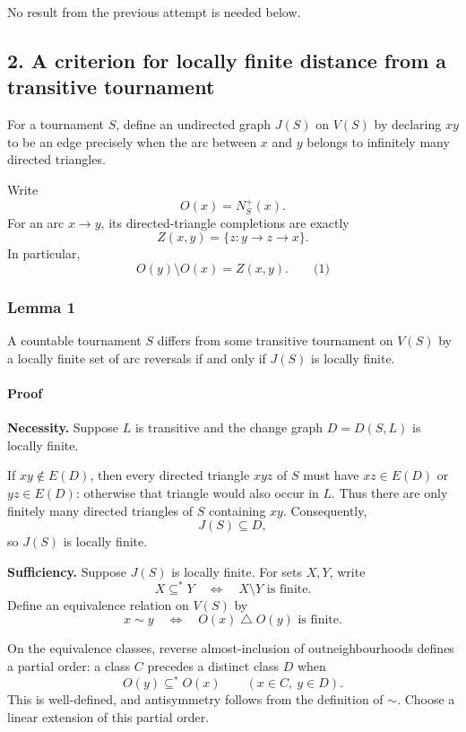 \documentclass[
  11pt,
  a4paper,
]{article}
\begin{document}
No result from the previous attempt is needed below.

\subsection{2. A criterion for locally finite distance from a transitive
tournament}\label{a-criterion-for-locally-finite-distance-from-a-transitive-tournament}

For a tournament \(S\), define an undirected graph \(J(S)\) on \(V(S)\)
by declaring \(xy\) to be an edge precisely when the arc between \(x\)
and \(y\) belongs to infinitely many directed triangles.

Write \[
O(x)=N_S^+(x).
\] For an arc \(x\to y\), its directed-triangle completions are exactly
\[
Z(x,y)=\{z:y\to z\to x\}.
\] In particular, \[
O(y)\setminus O(x)=Z(x,y).
\qquad\text{(1)}
\]

\subsubsection{Lemma 1}\label{lemma-1}

A countable tournament \(S\) differs from some transitive tournament on
\(V(S)\) by a locally finite set of arc reversals if and only if
\(J(S)\) is locally finite.

\paragraph{Proof}\label{proof}

\textbf{Necessity.} Suppose \(L\) is transitive and the change graph
\(D=D(S,L)\) is locally finite.

If \(xy\notin E(D)\), then every directed triangle \(xyz\) of \(S\) must
have \(xz\in E(D)\) or \(yz\in E(D)\): otherwise that triangle would
also occur in \(L\). Thus there are only finitely many directed
triangles of \(S\) containing \(xy\). Consequently, \[
J(S)\subseteq D,
\] so \(J(S)\) is locally finite.

\textbf{Sufficiency.} Suppose \(J(S)\) is locally finite. For sets
\(X,Y\), write \[
X\subseteq^\ast Y
\quad\Longleftrightarrow\quad
X\setminus Y\text{ is finite}.
\] Define an equivalence relation on \(V(S)\) by \[
x\sim y
\quad\Longleftrightarrow\quad
O(x)\mathbin{\triangle}O(y)\text{ is finite}.
\]

On the equivalence classes, reverse almost-inclusion of
outneighbourhoods defines a partial order: a class \(C\) precedes a
distinct class \(D\) when \[
O(y)\subseteq^\ast O(x)
\qquad(x\in C,\ y\in D).
\] This is well-defined, and antisymmetry follows from the definition of
\(\sim\). Choose a linear extension of this partial order.
\end{document}
